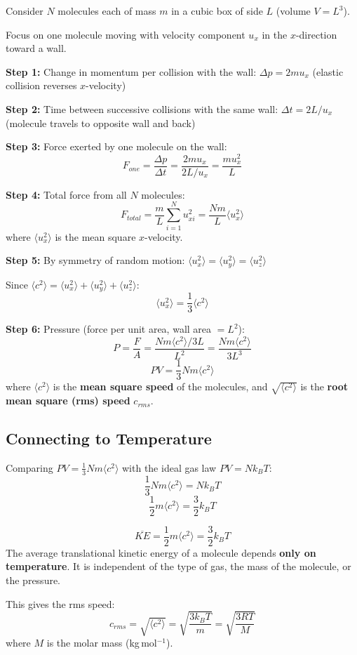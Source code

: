 \begin{processbox}
Consider $N$ molecules each of mass $m$ in a cubic
box of side $L$ (volume $V = L^3$).

Focus on one molecule moving with velocity component
$u_x$ in the $x$-direction toward a wall.

\textbf{Step 1:} Change in momentum per collision
with the wall:
$\Delta p = 2mu_x$ (elastic collision reverses $x$-velocity)

\textbf{Step 2:} Time between successive collisions
with the same wall:
$\Delta t = 2L/u_x$ (molecule travels to opposite wall and back)

\textbf{Step 3:} Force exerted by one molecule on the wall:
\[
  F_{one} = \frac{\Delta p}{\Delta t}
  = \frac{2mu_x}{2L/u_x} = \frac{mu_x^2}{L}
\]

\textbf{Step 4:} Total force from all $N$ molecules:
\[
  F_{total} = \frac{m}{L}\sum_{i=1}^N u_{xi}^2
  = \frac{Nm}{L}\langle u_x^2\rangle
\]
where $\langle u_x^2\rangle$ is the mean square
$x$-velocity.

\textbf{Step 5:} By symmetry of random motion:
$\langle u_x^2\rangle = \langle u_y^2\rangle
= \langle u_z^2\rangle$

Since $\langle c^2\rangle = \langle u_x^2\rangle
+ \langle u_y^2\rangle + \langle u_z^2\rangle$:
\[
  \langle u_x^2\rangle = \frac{1}{3}\langle c^2\rangle
\]

\textbf{Step 6:} Pressure (force per unit area,
wall area $= L^2$):
\[
  P = \frac{F}{A} = \frac{Nm\langle c^2\rangle/3L}{L^2}
  = \frac{Nm\langle c^2\rangle}{3L^3}
\]
\[
  \boxed{PV = \frac{1}{3}Nm\langle c^2\rangle}
\]
where $\langle c^2\rangle$ is the \textbf{mean square
speed} of the molecules, and $\sqrt{\langle c^2\rangle}$
is the \textbf{root mean square (rms) speed} $c_{rms}$.
\end{processbox}

\subsection{Connecting to Temperature}

Comparing $PV = \frac{1}{3}Nm\langle c^2\rangle$
with the ideal gas law $PV = Nk_BT$:
\[
  \frac{1}{3}Nm\langle c^2\rangle = Nk_BT
\]
\[
  \frac{1}{2}m\langle c^2\rangle = \frac{3}{2}k_BT
\]

\begin{keybox}
\[
  \overline{KE} = \frac{1}{2}m\langle c^2\rangle
  = \frac{3}{2}k_BT
\]
The average translational kinetic energy of a
molecule depends \textbf{only on temperature}.
It is independent of the type of gas, the mass of
the molecule, or the pressure.

This gives the rms speed:
\[
  c_{rms} = \sqrt{\langle c^2\rangle}
  = \sqrt{\frac{3k_BT}{m}}
  = \sqrt{\frac{3RT}{M}}
\]
where $M$ is the molar mass (kg\,mol$^{-1}$).
\end{keybox}

